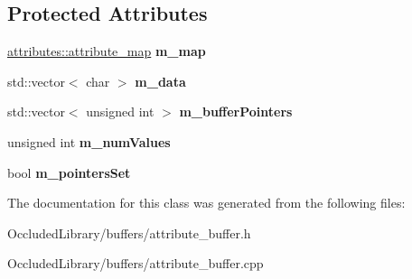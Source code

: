 \subsection*{Protected Attributes}
\begin{DoxyCompactItemize}
\item 
\hypertarget{classoccluded_1_1buffers_1_1attribute__buffer_a4b0f0972376235e0b6abdc308972d783}{\hyperlink{classoccluded_1_1buffers_1_1attributes_1_1attribute__map}{attributes\+::attribute\+\_\+map} {\bfseries m\+\_\+map}}\label{classoccluded_1_1buffers_1_1attribute__buffer_a4b0f0972376235e0b6abdc308972d783}

\item 
\hypertarget{classoccluded_1_1buffers_1_1attribute__buffer_a6eb7d66fdb8c85469aaa8e473f454dc3}{std\+::vector$<$ char $>$ {\bfseries m\+\_\+data}}\label{classoccluded_1_1buffers_1_1attribute__buffer_a6eb7d66fdb8c85469aaa8e473f454dc3}

\item 
\hypertarget{classoccluded_1_1buffers_1_1attribute__buffer_af15ffb47f059241a61ff6e1dfec12439}{std\+::vector$<$ unsigned int $>$ {\bfseries m\+\_\+buffer\+Pointers}}\label{classoccluded_1_1buffers_1_1attribute__buffer_af15ffb47f059241a61ff6e1dfec12439}

\item 
\hypertarget{classoccluded_1_1buffers_1_1attribute__buffer_acb44ffcc53b7f4e3ebc83bd69791238d}{unsigned int {\bfseries m\+\_\+num\+Values}}\label{classoccluded_1_1buffers_1_1attribute__buffer_acb44ffcc53b7f4e3ebc83bd69791238d}

\item 
\hypertarget{classoccluded_1_1buffers_1_1attribute__buffer_a23f52b63882d1ea6864995672be40577}{bool {\bfseries m\+\_\+pointers\+Set}}\label{classoccluded_1_1buffers_1_1attribute__buffer_a23f52b63882d1ea6864995672be40577}

\end{DoxyCompactItemize}


The documentation for this class was generated from the following files\+:\begin{DoxyCompactItemize}
\item 
Occluded\+Library/buffers/attribute\+\_\+buffer.\+h\item 
Occluded\+Library/buffers/attribute\+\_\+buffer.\+cpp\end{DoxyCompactItemize}
